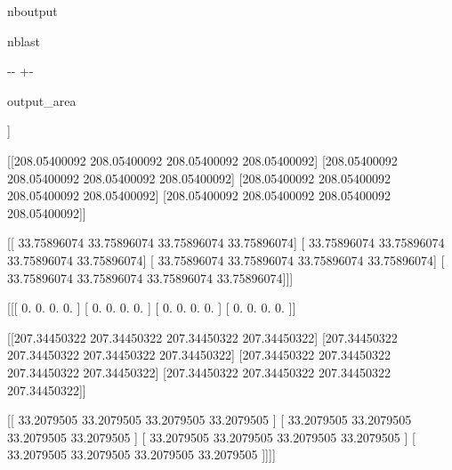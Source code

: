 \documentclass[letterpaper,10pt,english]{sphinxmanual}
\begin{document}
\begin{sphinxuseclass}{nboutput}
\begin{sphinxuseclass}{nblast}
{

\kern-\sphinxverbatimsmallskipamount\kern-\baselineskip
\kern+\FrameHeightAdjust\kern-\fboxrule
\vspace{\nbsphinxcodecellspacing}

\begin{sphinxuseclass}{output_area}
\begin{sphinxuseclass}{}


\begin{sphinxVerbatim}[commandchars=\\\{\}]
[[[[  0.           0.           0.           0.        ]
   [  0.           0.           0.           0.        ]
   [  0.           0.           0.           0.        ]
   [  0.           0.           0.           0.        ]]

  [[208.05400092 208.05400092 208.05400092 208.05400092]
   [208.05400092 208.05400092 208.05400092 208.05400092]
   [208.05400092 208.05400092 208.05400092 208.05400092]
   [208.05400092 208.05400092 208.05400092 208.05400092]]

  [[ 33.75896074  33.75896074  33.75896074  33.75896074]
   [ 33.75896074  33.75896074  33.75896074  33.75896074]
   [ 33.75896074  33.75896074  33.75896074  33.75896074]
   [ 33.75896074  33.75896074  33.75896074  33.75896074]]]


 [[[  0.           0.           0.           0.        ]
   [  0.           0.           0.           0.        ]
   [  0.           0.           0.           0.        ]
   [  0.           0.           0.           0.        ]]

  [[207.34450322 207.34450322 207.34450322 207.34450322]
   [207.34450322 207.34450322 207.34450322 207.34450322]
   [207.34450322 207.34450322 207.34450322 207.34450322]
   [207.34450322 207.34450322 207.34450322 207.34450322]]

  [[ 33.2079505   33.2079505   33.2079505   33.2079505 ]
   [ 33.2079505   33.2079505   33.2079505   33.2079505 ]
   [ 33.2079505   33.2079505   33.2079505   33.2079505 ]
   [ 33.2079505   33.2079505   33.2079505   33.2079505 ]]]]
\end{sphinxVerbatim}



\end{sphinxuseclass}
\end{sphinxuseclass}
}

\end{sphinxuseclass}
\end{sphinxuseclass}
\end{document}
